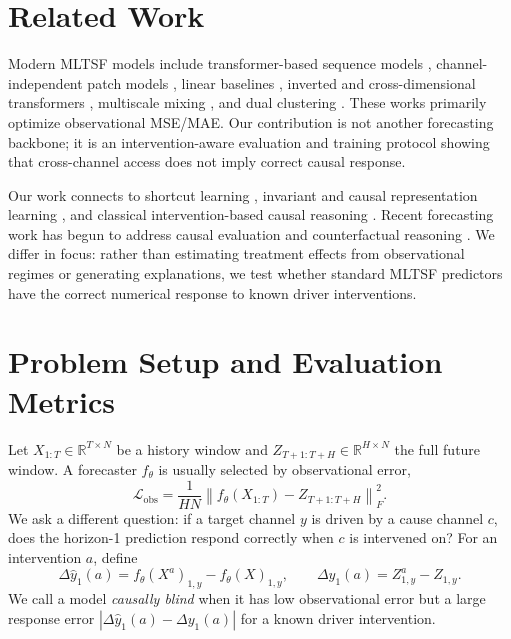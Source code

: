 \documentclass{article}
\begin{document}
\section{Related Work}
\label{sec:related_main}

Modern MLTSF models include transformer-based sequence models
\citep{zhou2021informer,wu2021autoformer,zhou2022fedformer}, channel-independent
patch models \citep{nie2023patchtst}, linear baselines
\citep{zeng2023transformers}, inverted and cross-dimensional transformers
\citep{liu2024itransformer,zhang2023crossformer}, multiscale mixing
\citep{wang2024timemixer}, and dual clustering \citep{qiu2025duet}. These works
primarily optimize observational MSE/MAE. Our contribution is not another
forecasting backbone; it is an intervention-aware evaluation and training protocol
showing that cross-channel access does not imply correct causal response.

Our work connects to shortcut learning \citep{geirhos2020shortcut}, invariant and
causal representation learning
\citep{arjovsky2019invariant,scholkopf2021toward}, and classical intervention-based
causal reasoning \citep{granger1969investigating,pearl2009causality,peters2017elements}.
Recent forecasting work has begun to address causal evaluation and counterfactual
reasoning \citep{crasson2024training,yan2023self,yang2025learning}. We differ in
focus: rather than estimating treatment effects from observational regimes or
generating explanations, we test whether standard MLTSF predictors have the correct
numerical response to known driver interventions.

\section{Problem Setup and Evaluation Metrics}
\label{sec:evaluation}

Let $X_{1:T}\in\mathbb{R}^{T\times N}$ be a history window and
$Z_{T+1:T+H}\in\mathbb{R}^{H\times N}$ the full future window. A forecaster
$f_\theta$ is usually selected by observational error,
\begin{equation}
\mathcal{L}_{\mathrm{obs}}
=
\frac{1}{HN}\left\|f_\theta(X_{1:T})-Z_{T+1:T+H}\right\|_F^2 .
\end{equation}
We ask a different question: if a target channel $y$ is driven by a cause channel
$c$, does the horizon-1 prediction respond correctly when $c$ is intervened on?
For an intervention $a$, define
\begin{equation}
\Delta \hat{y}_{1}(a)=f_\theta(X^a)_{1,y}-f_\theta(X)_{1,y},\qquad
\Delta y_{1}(a)=Z^a_{1,y}-Z_{1,y}.
\end{equation}
We call a model \emph{causally blind} when it has low observational error but a
large response error $|\Delta\hat{y}_{1}(a)-\Delta y_{1}(a)|$ for a known driver
intervention.
\end{document}
